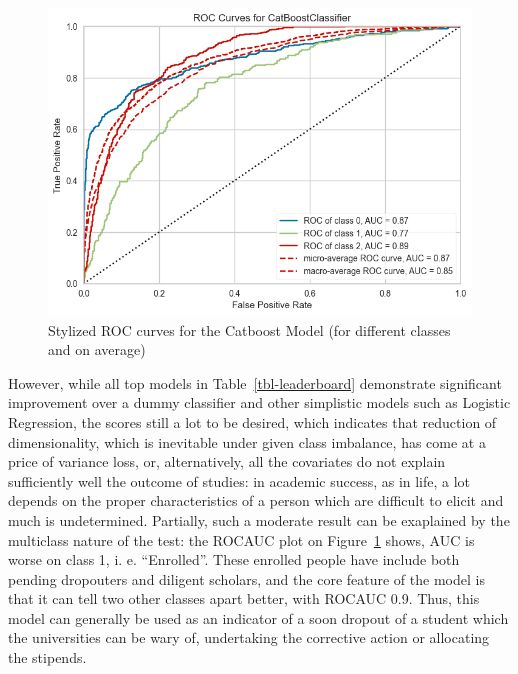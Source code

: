 \documentclass[
  letterpaper,
  DIV=11,
  numbers=noendperiod]{scrartcl}
\begin{document}
\begin{figure}

{\centering \includegraphics{report_AzadhdhinNedalYunisAlFraijat_files/figure-pdf/fig-rocauc-output-1.png}

}

\caption{\label{fig-rocauc}Stylized ROC curves for the Catboost Model
(for different classes and on average)}

\end{figure}

However, while all top models in Table~\ref{tbl-leaderboard} demonstrate
significant improvement over a dummy classifier and other simplistic
models such as Logistic Regression, the scores still a lot to be
desired, which indicates that reduction of dimensionality, which is
inevitable under given class imbalance, has come at a price of variance
loss, or, alternatively, all the covariates do not explain sufficiently
well the outcome of studies: in academic success, as in life, a lot
depends on the proper characteristics of a person which are difficult to
elicit and much is undetermined. Partially, such a moderate result can
be exaplained by the multiclass nature of the test: the ROCAUC plot on
Figure~\ref{fig-rocauc} shows, AUC is worse on class 1, i. e.
\enquote{Enrolled}. These enrolled people have include both pending
dropouters and diligent scholars, and the core feature of the model is
that it can tell two other classes apart better, with ROCAUC 0.9. Thus,
this model can generally be used as an indicator of a soon dropout of a
student which the universities can be wary of, undertaking the
corrective action or allocating the stipends.
\end{document}
